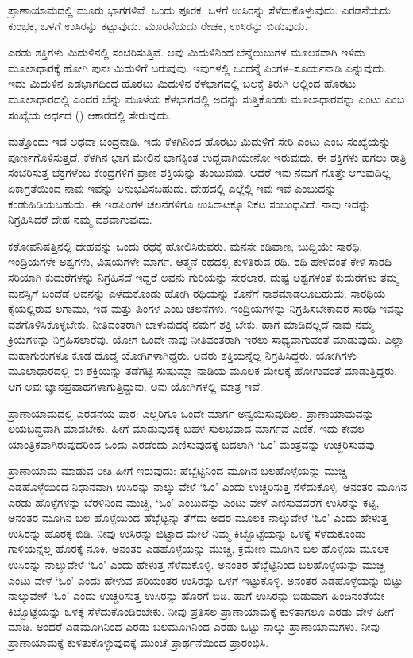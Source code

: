 ಪ್ರಾಣಾಯಾಮದಲ್ಲಿ ಮೂರು ಭಾಗಗಳಿವೆ. ಒಂದು ಪೂರಕ, ಒಳಗೆ ಉಸಿರನ್ನು ಸೆಳೆದುಕೊಳ್ಳುವುದು. ಎರಡನೆಯದು ಕುಂಭಕ, ಒಳಗೆ ಉಸಿರನ್ನು ಕಟ್ಟುವುದು. ಮೂರನೆಯದು ರೇಚಕ, ಉಸಿರನ್ನು ಬಿಡುವುದು.

ಎರಡು ಶಕ್ತಿಗಳು ಮಿದುಳಿನಲ್ಲಿ ಸಂಚರಿಸುತ್ತಿವೆ. ಅವು ಮಿದುಳಿನಿಂದ ಬೆನ್ನೆಲುಬುಗಳ ಮೂಲಕವಾಗಿ ಇಳಿದು ಮೂಲಾಧಾರಕ್ಕೆ ಹೋಗಿ ಪುನಃ ಮಿದುಳಿಗೆ ಬರುವುವು. ಇವುಗಳಲ್ಲಿ ಒಂದನ್ನೆ ಪಿಂಗಳ–ಸೂರ್ಯನಾಡಿ ಎನ್ನುವುದು. ಇದು ಮಿದುಳಿನ ಎಡಭಾಗದಿಂದ ಹೊರಟು ಮಿದುಳಿನ ಕೆಳಭಾಗದಲ್ಲಿ ಬಲಕ್ಕೆ ತಿರುಗಿ ಅಲ್ಲಿಂದ ಹೊರಟು ಮೂಲಾಧಾರದಲ್ಲಿ ಎಂದರೆ ಬೆನ್ನು ಮೂಳೆಯ ಕೆಳಭಾಗದಲ್ಲಿ ಅದನ್ನು ಸುತ್ತಿಕೊಂಡು ಮೂಲಾಧಾರವನ್ನು ಎಂಟು ಎಂಬ ಸಂಖ್ಯೆಯ ಅರ್ಧದ () ಆಕಾರದಲ್ಲಿ ಸೇರುವುದು.

ಮತ್ತೊಂದು ಇಡ ಅಥವಾ ಚಂದ್ರನಾಡಿ. ಇದು ಕೆಳಗಿನಿಂದ ಹೊರಟು ಮಿದುಳಿಗೆ ಸೇರಿ ಎಂಟು ಎಂಬ ಸಂಖ್ಯೆಯನ್ನು ಪೂರ್ಣಗೊಳಿಸುತ್ತದೆ. ಕೆಳಗಿನ ಭಾಗ ಮೇಲಿನ ಭಾಗಕ್ಕಿಂತ ಉದ್ದವಾಗಿಯೇನೋ ಇರುವುದು. ಈ ಶಕ್ತಿಗಳು ಹಗಲು ರಾತ್ರಿ ಸಂಚರಿಸುತ್ತ ಚಕ್ರಗಳೆಂಬ ಕೇಂದ್ರಗಳಿಗೆ ಪ್ರಾಣ ಶಕ್ತಿಯನ್ನು ತುಂಬುವುವು. ಆದರೆ ಇವು ನಮಗೆ ಗೊತ್ತೇ ಆಗುವುದಿಲ್ಲ. ಏಕಾಗ್ರತೆಯಿಂದ ನಾವು ಇವನ್ನು ಅನುಭವಿಸಬಹುದು. ದೇಹದಲ್ಲಿ ಎಲ್ಲೆಲ್ಲಿ ಇವು ಇವೆ ಎಂಬುದನ್ನು ಕಂಡುಹಿಡಿಯಬಹುದು. ಈ ಇಡಪಿಂಗಳ ಚಲನೆಗಳಿಗೂ ಉಸಿರಾಟಕ್ಕೂ ನಿಕಟ ಸಂಬಂಧವಿದೆ. ನಾವು ಇದನ್ನು ನಿಗ್ರಹಿಸಿದರೆ ದೇಹ ನಮ್ಮ ವಶವಾಗುವುದು.

ಕಠೋಪನಿಷತ್ತಿನಲ್ಲಿ ದೇಹವನ್ನು ಒಂದು ರಥಕ್ಕೆ ಹೋಲಿಸಿರುವರು. ಮನಸೇ ಕಡಿವಾಣ, ಬುದ್ದಿಯೇ ಸಾರಥಿ, ಇಂದ್ರಿಯಗಳೇ ಅಶ್ವಗಳು, ವಿಷಯಗಳೇ ಮಾರ್ಗ. ಆತ್ಮನೆ ರಥದಲ್ಲಿ ಕುಳಿತಿರುವ ರಥಿ. ರಥಿ ಹೇಳಿದಂತೆ ಕೇಳಿ ಸಾರಥಿ ಸರಿಯಾಗಿ ಕುದುರೆಗಳನ್ನು ನಿಗ್ರಹಿಸದೆ ಇದ್ದರೆ ಅವನು ಗುರಿಯನ್ನು ಸೇರಲಾರ. ದುಷ್ಟ ಅಶ್ವಗಳಂತೆ ಕುದುರೆಗಳು ತಮ್ಮ ಮನಸ್ಸಿಗೆ ಬಂದೆಡೆ ಅವನನ್ನು ಎಳೆದುಕೊಂಡು ಹೋಗಿ ರಥಿಯನ್ನು ಕೊನೆಗೆ ನಾಶ\break ಮಾಡಲೂಬಹುದು. ಸಾರಥಿಯ ಕೈಯಲ್ಲಿರುವ ಲಗಾಮು, ಇಡ ಮತ್ತು ಪಿಂಗಳ ಎಂಬ ಚಲನೆಗಳು. ಇಂದ್ರಿಯಗಳನ್ನು ನಿಗ್ರಹಿಸಬೇಕಾದರೆ ಸಾರಥಿ ಇವನ್ನು ವಶಗೊಳಿಸಿಕೊಳ್ಳ\-ಬೇಕು. ನೀತಿವಂತರಾಗಿ ಬಾಳುವುದಕ್ಕೆ ನಮಗೆ ಶಕ್ತಿ ಬೇಕು. ಹಾಗೆ ಮಾಡಿದಲ್ಲದೆ ನಾವು ನಮ್ಮ ಕ್ರಿಯೆಗಳನ್ನು ನಿಗ್ರಹಿಸಲಾರೆವು. ಯೋಗ ಒಂದೇ ನಾವು ನೀತಿವಂತರಾಗಿ ಇರಲು ಸಾಧ್ಯವಾಗುವಂತೆ ಮಾಡುವುದು. ಎಲ್ಲಾ ಮಹಾಗುರುಗಳೂ ಕೂಡ ದೊಡ್ಡ ಯೋಗಿಗಳಾಗಿದ್ದರು. ಅವರು ಶಕ್ತಿಯನ್ನೆಲ್ಲ ನಿಗ್ರಹಿಸಿದ್ದರು. ಯೋಗಿಗಳು ಮೂಲಾಧಾರದಲ್ಲಿ ಈ ಶಕ್ತಿಯನ್ನು ತಡೆಗಟ್ಟಿ ಸುಷುಮ್ನಾ ನಾಡಿಯ ಮೂಲಕ ಮೇಲಕ್ಕೆ ಹೋಗುವಂತೆ ಮಾಡುತ್ತಿದ್ದರು. ಆಗ ಅವು ಜ್ಞಾನಪ್ರವಾಹಗಳಾಗುತ್ತಿದ್ದುವು. ಅವು ಯೋಗಿಗಳಲ್ಲಿ ಮಾತ್ರ ಇವೆ.

ಪ್ರಾಣಾಯಾಮದಲ್ಲಿ ಎರಡನೆಯ ಪಾಠ: ಎಲ್ಲರಿಗೂ ಒಂದೇ ಮಾರ್ಗ ಅನ್ವಯಿಸುವುದಿಲ್ಲ. ಪ್ರಾಣಾಯಾಮವನ್ನು ಲಯಬದ್ಧವಾಗಿ ಮಾಡಬೇಕು. ಹೀಗೆ ಮಾಡುವುದಕ್ಕೆ ಬಹಳ ಸುಲಭವಾದ ಮಾರ್ಗವೆ ಎಣಿಕೆ. ಇದು ಕೇವಲ ಯಾಂತ್ರಿಕವಾಗಿರುವುದರಿಂದ ಒಂದು ಎರಡೆಂದು ಎಣಿಸುವುದಕ್ಕೆ ಬದಲಾಗಿ `ಓಂ' ಮಂತ್ರವನ್ನು ಉಚ್ಚರಿಸುವೆವು.

ಪ್ರಾಣಾಯಾಮ ಮಾಡುವ ರೀತಿ ಹೀಗೆ ಇರುವುದು: ಹೆಬ್ಬೆಟ್ಟಿನಿಂದ ಮೂಗಿನ ಬಲಹೊಳ್ಳೆಯನ್ನು ಮುಚ್ಚಿ ಎಡಹೊಳ್ಳೆಯಿಂದ ನಿಧಾನವಾಗಿ ಉಸಿರನ್ನು ನಾಲ್ಕು ವೇಳೆ `ಓಂ' ಎಂದು ಉಚ್ಚರಿಸುತ್ತ ಸೆಳೆದುಕೊಳ್ಳಿ. ಅನಂತರ ಮೂಗಿನ ಎರಡು ಹೊಳ್ಳೆಗಳನ್ನು ಬೆರಳಿನಿಂದ ಮುಚ್ಚಿ, `ಓಂ' ಎಂಬುದನ್ನು ಎಂಟು ವೇಳೆ ಎಣಿಸುವವರೆಗೆ ಉಸಿರನ್ನು ಕಟ್ಟಿ, ಅನಂತರ ಮೂಗಿನ ಬಲ ಹೊಳ್ಳೆಯಿಂದ ಹೆಬ್ಬೆಟ್ಟನ್ನು ತೆಗೆದು ಅದರ ಮೂಲಕ ನಾಲ್ಕುವೇಳೆ `ಓಂ' ಎಂದು ಹೇಳುತ್ತ ಉಸಿರನ್ನು ಹೊರಕ್ಕೆ ಬಿಡಿ. ನೀವು ಉಸಿರನ್ನು ಬಿಟ್ಟಾದ ಮೇಲೆ ನಿಮ್ಮ ಕಿಬ್ಬೊಟ್ಟೆಯನ್ನು ಒಳಕ್ಕೆ ಸೆಳೆದುಕೊಂಡು ಗಾಳಿಯನ್ನೆಲ್ಲ ಹೊರಕ್ಕೆ ನೂಕಿ. ಅನಂತರ ಎಡಹೊಳ್ಳೆಯನ್ನು ಮುಚ್ಚಿ, ಕ್ರಮೇಣ ಮೂಗಿನ ಬಲ ಹೊಳ್ಳೆಯ ಮೂಲಕ ಉಸಿರನ್ನು ನಾಲ್ಕುವೇಳೆ `ಓಂ' ಎಂದು ಹೇಳುತ್ತ ಸೆಳೆದುಕೊಳ್ಳಿ. ಅನಂತರ ಹೆಬ್ಬೆಟ್ಟಿನಿಂದ ಬಲಹೊಳ್ಳೆಯನ್ನು ಮುಚ್ಚಿ ಎಂಟು ವೇಳೆ `ಓಂ' ಎಂದು ಹೇಳುವ ಪರಿಯಂತರ ಉಸಿರನ್ನು ಒಳಗೆ ಇಟ್ಟುಕೊಳ್ಳಿ. ಅನಂತರ ಎಡಹೊಳ್ಳೆಯನ್ನು ಬಿಟ್ಟು ನಾಲ್ಕುವೇಳೆ `ಓಂ' ಎಂದು ಉಚ್ಚರಿಸುತ್ತ ಉಸಿರನ್ನು ಹೊರಗೆ ಬಿಡಿ. ಹಾಗೆ ಉಸಿರನ್ನು ಬಿಡುವಾಗ ಹಿಂದಿನಂತೆಯೇ ಕಿಬ್ಬೊಟ್ಟೆಯನ್ನು ಒಳಕ್ಕೆ ಸೆಳೆದುಕೊಂಡಿರಬೇಕು. ನೀವು ಪ್ರತಿಸಲ ಪ್ರಾಣಾಯಾಮಕ್ಕೆ ಕುಳಿತಾಗಲೂ ಎರಡು ವೇಳೆ ಹೀಗೆ ಮಾಡಿ. ಅಂದರೆ ಎಡಮೂಗಿನಿಂದ ಎರಡು ಬಲಮೂಗಿನಿಂದ ಎರಡು ಒಟ್ಟು ನಾಲ್ಕು ಪ್ರಾಣಾಯಾಮಗಳು. ನೀವು ಪ್ರಾಣಾಯಾಮಕ್ಕೆ ಕುಳಿತುಕೊಳ್ಳುವುದಕ್ಕೆ ಮುಂಚೆ ಪ್ರಾರ್ಥನೆಯಿಂದ ಪ್ರಾರಂಭಿಸಿ.

